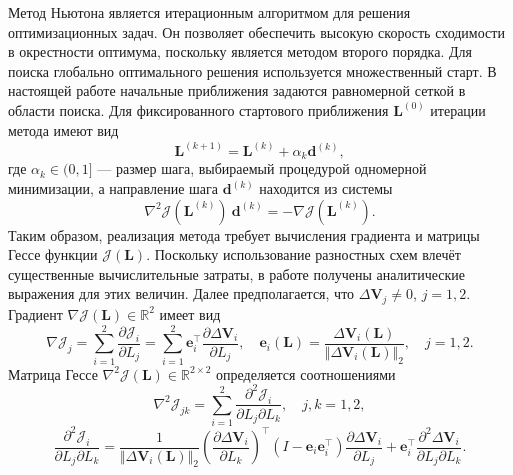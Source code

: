 Метод Ньютона является итерационным алгоритмом для решения оптимизационных задач. Он позволяет обеспечить высокую скорость сходимости в окрестности оптимума, поскольку является методом второго порядка. Для поиска глобально оптимального решения используется множественный старт. В настоящей работе начальные приближения задаются равномерной сеткой в области поиска. Для фиксированного стартового приближения $\mathbf{L}^{(0)}$ итерации метода имеют вид
\begin{equation*}
    \mathbf{L}^{(k+1)} = \mathbf{L}^{(k)} + \alpha_k \mathbf{d}^{(k)},
\end{equation*}
где $\alpha_k \in (0, 1]$ --- размер шага, выбираемый процедурой одномерной минимизации, а направление шага $\mathbf{d}^{(k)}$ находится из системы
\begin{equation*}
    \nabla^2 \mathcal{J}(\mathbf{L}^{(k)})~ \mathbf{d}^{(k)} = - \nabla \mathcal{J}(\mathbf{L}^{(k)}).
\end{equation*}
Таким образом, реализация метода требует вычисления градиента и матрицы Гессе функции $\mathcal{J}(\mathbf{L})$. Поскольку использование разностных схем влечёт существенные вычислительные затраты, в работе получены аналитические выражения для этих величин. Далее предполагается, что $\Delta \mathbf{V}_j \neq 0$, $j = 1, 2$. Градиент $\nabla \mathcal{J}(\mathbf{L}) \in \mathbb{R}^{2}$ имеет вид
\begin{equation*}
    \nabla \mathcal{J}_j = \sum_{i=1}^{2} \frac{\partial \mathcal{J}_i}{\partial L_j} =
    \sum_{i=1}^{2} \mathbf{e}_i^\top \frac{\partial \Delta \mathbf{V}_i}{\partial L_j}, \quad
    \mathbf{e}_i (\mathbf{L}) = \frac{\Delta \mathbf{V}_i (\mathbf{L})}{\Vert \Delta \mathbf{V}_i (\mathbf{L}) \Vert_2}, \quad
    j = 1, 2.
\end{equation*}
Матрица Гессе $\nabla^2 \mathcal{J}(\mathbf{L}) \in \mathbb{R}^{2 \times 2}$ определяется соотношениями
\begin{equation*}
    \nabla^2 \mathcal{J}_{jk} = \sum_{i=1}^{2} \frac{\partial^2 \mathcal{J}_i}{\partial L_j \partial L_k}, \quad j, k = 1, 2,
\end{equation*}
\begin{equation*}
    \frac{\partial^2 \mathcal{J}_i}{\partial L_j \partial L_k} =
    \frac{1}{\Vert \Delta \mathbf{V}_i (\mathbf{L}) \Vert_2} 
    \left( \frac{\partial \Delta \mathbf{V}_i}{\partial L_k} \right)^\top \left( I - \mathbf{e}_i \mathbf{e}_i^\top \right)
    \frac{\partial \Delta \mathbf{V}_i}{\partial L_j} + \mathbf{e}_i^\top \frac{\partial^2 \Delta \mathbf{V}_i}{\partial L_j \partial L_k}.
\end{equation*}
